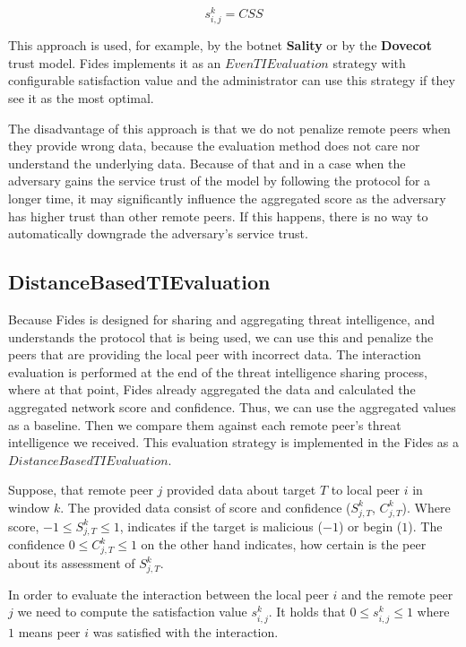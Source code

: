\begin{equation}
s^{k}_{i, j} = CSS
\end{equation}

This approach is used, for example, by the botnet \textbf{Sality} or by the \textbf{Dovecot} trust model. Fides implements it as an $EvenTIEvaluation$ strategy with configurable satisfaction value and the administrator can use this strategy if they see it as the most optimal.

The disadvantage of this approach is that we do not penalize remote peers when they provide wrong data, because the evaluation method does not care nor understand the underlying data.
Because of that and in a case when the adversary gains the service trust of the model by following the protocol for a longer time, it may significantly influence the aggregated score as the adversary has higher trust than other remote peers. If this happens, there is no way to automatically downgrade the adversary's service trust.

\subsection{DistanceBasedTIEvaluation}
\label{subsec:distance-based-eval}
Because Fides is designed for sharing and aggregating threat intelligence, and understands the protocol that is being used, we can use this and penalize the peers that are providing the local peer with incorrect data.
The interaction evaluation is performed at the end of the threat intelligence sharing process, where at that point, Fides already aggregated the data and calculated the aggregated network score and confidence. 
Thus, we can use the aggregated values as a baseline. Then we compare them against each remote peer's threat intelligence we received. This evaluation strategy is implemented in the Fides as a $DistanceBasedTIEvaluation$.

Suppose, that remote peer $j$ provided data about target $T$ to local peer $i$ in window $k$. The provided data consist of score and confidence ($S^{k}_{j, T}$, $C^{k}_{j, T}$). Where score,  $-1 \leq S^{k}_{j, T} \leq 1$, indicates if the target is malicious ($-1$) or begin ($1$). The confidence $0 \leq C^{k}_{j, T} \leq 1$ on the other hand indicates, how certain is the peer about its assessment of $S^{k}_{j, T}$.

In order to evaluate the interaction between the local peer $i$ and the remote peer $j$ we need to compute the satisfaction value $s^{k}_{i, j}$. 
It holds that  $0 \leq s^{k}_{i, j} \leq 1$ where $1$ means peer $i$ was satisfied with the interaction.


